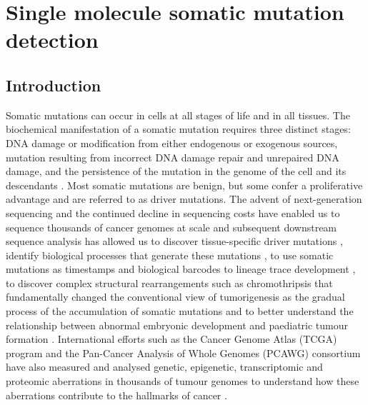 
\chapter{Single molecule somatic mutation detection}

\ifpdf
    \graphicspath{{Chapter2/Figs/Raster/}{Chapter2/Figs/PDF/}{Chapter2/Figs/}}
\else
    \graphicspath{{Chapter2/Figs/Vector/}{Chapter2/Figs/}}
\fi

\section{Introduction}

Somatic mutations can occur in cells at all stages of life and in all tissues. The biochemical manifestation of a somatic mutation requires three distinct stages: DNA damage or modification from either endogenous or exogenous sources, mutation resulting from incorrect DNA damage repair and unrepaired DNA damage, and the persistence of the mutation in the genome of the cell and its descendants \cite{Stratton2009-of}. Most somatic mutations are benign, but some confer a proliferative advantage and are referred to as driver mutations. The advent of next-generation sequencing and the continued decline in sequencing costs have enabled us to sequence thousands of cancer genomes at scale and subsequent downstream sequence analysis has allowed us to discover tissue-specific driver mutations \cite{Martinez-Jimenez2020-kn}, identify biological processes that generate these mutations \cite{Alexandrov2013-kg}, to use somatic mutations as timestamps and biological barcodes to lineage trace development \cite{Behjati2014-gb}, to discover complex structural rearrangements such as chromothripsis \cite{Stephens2011-gj} that fundamentally changed the conventional view of tumorigenesis as the gradual process of the accumulation of somatic mutations \cite{Doll1954-of, Knudson1971-fg} and to better understand the relationship between abnormal embryonic development and paediatric tumour formation \cite{Marshall2014-ec}. International efforts such as the Cancer Genome Atlas (TCGA) program \cite{Weinstein2013-ko} and the Pan-Cancer Analysis of Whole Genomes (PCAWG) consortium \cite{ICGCTCGA_Pan-Cancer_Analysis_of_Whole_Genomes_Consortium2020-ts} have also measured and analysed genetic, epigenetic, transcriptomic and proteomic aberrations in thousands of tumour genomes to understand how these aberrations contribute to the hallmarks of cancer \cite{Hanahan2000-dp, Hanahan2011-zr}. 

